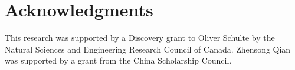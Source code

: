 \documentclass{acm_proc_article-sp}
\begin{document}
\section*{Acknowledgments}
This research was supported by a Discovery grant to Oliver Schulte by the Natural Sciences and Engineering Research Council of Canada. 
Zhensong Qian was  supported by a grant from the China Scholarship Council.




 

\balance
\end{document}
